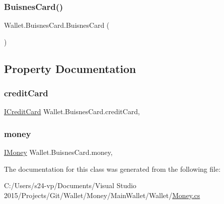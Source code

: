 \subsubsection{\texorpdfstring{Buisnes\+Card()}{BuisnesCard()}}
{\footnotesize\ttfamily Wallet.\+Buisnes\+Card.\+Buisnes\+Card (\begin{DoxyParamCaption}{ }\end{DoxyParamCaption})}



\subsection{Property Documentation}
\hypertarget{class_wallet_1_1_buisnes_card_a87a31a78633e0f80607c1f6b3ab0c6e9}{}\label{class_wallet_1_1_buisnes_card_a87a31a78633e0f80607c1f6b3ab0c6e9} 
\subsubsection{\texorpdfstring{credit\+Card}{creditCard}}
{\footnotesize\ttfamily \hyperlink{interface_wallet_1_1_i_credit_card}{I\+Credit\+Card} Wallet.\+Buisnes\+Card.\+credit\+Card\hspace{0.3cm}{\ttfamily [get]}, {\ttfamily [set]}}

\hypertarget{class_wallet_1_1_buisnes_card_ad34b055b2670cd2d67eab4c8f18e6b40}{}\label{class_wallet_1_1_buisnes_card_ad34b055b2670cd2d67eab4c8f18e6b40} 
\subsubsection{\texorpdfstring{money}{money}}
{\footnotesize\ttfamily \hyperlink{interface_wallet_1_1_i_money}{I\+Money} Wallet.\+Buisnes\+Card.\+money\hspace{0.3cm}{\ttfamily [get]}, {\ttfamily [set]}}



The documentation for this class was generated from the following file\+:\begin{DoxyCompactItemize}
\item 
C\+:/\+Users/s24-\/vp/\+Documents/\+Visual Studio 2015/\+Projects/\+Git/\+Wallet/\+Money/\+Main\+Wallet/\+Wallet/\hyperlink{_money_8cs}{Money.\+cs}\end{DoxyCompactItemize}
